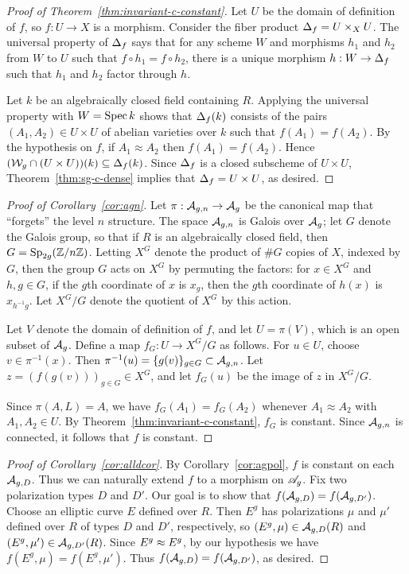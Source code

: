 \documentclass{amsart}
\begin{document}
\begin{proof}[Proof of Theorem~\ref{thm:invariant-c-constant}]
  Let $U$ be the domain of definition of $f$, so $f: U \to X$ is a morphism. Consider the fiber product $\Delta_f = U \times_X U$.
  The universal property of $\Delta_f$ says that for any scheme $W$ and morphisms $h_1$ and $h_2$ from $W$ to $U$ such that $f \circ h_1 = f \circ h_2$, there is a unique morphism $h: W \to \Delta_f$ such that $h_1$ and $h_2$ factor through $h$.

  Let $k$ be an algebraically closed field containing $R$.
  Applying the universal property with $W = \operatorname{Spec} k$ shows that $\Delta_f(k)$ consists of the pairs $(A_1,A_2) \in U \times U$ of abelian varieties over $k$ such that $f(A_1) = f(A_2)$.
  By the hypothesis on $f$, if $A_1 \approx A_2$ then $f(A_1) = f(A_2)$. Hence $(\mathcal{W}_g \cap (U \times U))(k) \subseteq \Delta_f(k)$.
  Since $\Delta_f$ is a closed subscheme of $U \times U$, Theorem~\ref{thm:sg-c-dense} implies that $\Delta_f = U \times U$, as desired.
\end{proof}

\begin{proof}[Proof of Corollary~\ref{cor:agn}]
  Let $\pi: \mathcal{A}_{g,n} \to \mathcal{A}_g$ be the canonical map that ``forgets'' the level $n$ structure. The space $\mathcal{A}_{g,n}$ is Galois over $\mathcal{A}_g$; let $G$ denote the Galois group, so that if $R$ is an algebraically closed field, then $G = \operatorname{Sp}_{2g}(\mathbb{Z}/n\mathbb{Z})$. Letting $X^G$ denote the product of $\# G$ copies of $X$, indexed by $G$, then the group $G$ acts on $X^G$ by permuting the factors: for $x \in X^G$ and $h,g \in G$, if the $g$th coordinate of $x$ is $x_g$, then the $g$th coordinate of $h(x)$ is $x_{h^{-1}g}$.
  Let $X^G/G$ denote the quotient of $X^G$ by this action.

  Let $V$ denote the domain of definition of $f$, and let $U = \pi(V)$, which is an open subset of $\mathcal{A}_g$. Define a map $f_G: U \to X^G/G$ as follows. For $u \in U$, choose  $v \in \pi^{-1}(x)$. Then $\pi^{-1}(u) = \{g(v)\}_{g \in G} \subset \mathcal{A}_{g,n}$. Let $z = (f(g(v)))_{g \in G} \in X^G$, and let $f_G(u)$ be the image of $z$ in $X^G/G$.

  Since $\pi(A,L) = A$, we have $f_G(A_1) = f_G(A_2)$ whenever $A_1 \approx A_2$ with $A_1,A_2 \in U$. By Theorem~\ref{thm:invariant-c-constant}, $f_G$ is constant. Since $\mathcal{A}_{g,n}$ is connected, it follows that $f$ is constant.
\end{proof}

\begin{proof}[Proof of Corollary~\ref{cor:alldcor}]
  By Corollary~\ref{cor:agpol}, $f$ is constant on each $\mathcal{A}_{g,{D}}$. Thus we can naturally extend $f$ to a morphism on $\mathscr{A}_g$. Fix two polarization types $D$ and $D'$. Our goal is to show that $f(\mathcal{A}_{g,{D}}) = f(\mathcal{A}_{g,{D'}})$. Choose an elliptic curve $E$ defined over $R$. Then $E^g$ has polarizations $\mu$ and $\mu'$ defined over $R$ of types $D$ and $D'$, respectively, so $(E^g, \mu) \in \mathcal{A}_{g,{D}}(R)$ and $(E^g,\mu') \in \mathcal{A}_{g,{D'}}(R)$. Since $E^g \approx E^g$, by our hypothesis we have $f(E^g, \mu) = f(E^g, \mu')$. Thus $f(\mathcal{A}_{g,{D}}) = f(\mathcal{A}_{g,{D'}})$, as desired. 
\end{proof}
\end{document}
